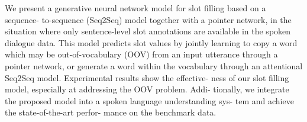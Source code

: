 We present a generative neural network model for slot filling based on a sequence- to-sequence (Seq2Seq) model together with a pointer network, in the situation where only sentence-level slot annotations are available in the spoken dialogue data. This model predicts slot values by jointly learning to copy a word which may be out-of-vocabulary (OOV) from an input utterance through a pointer network, or generate a word within the vocabulary through an attentional Seq2Seq model. Experimental results show the effective- ness of our slot filling model, especially at addressing the OOV problem. Addi- tionally, we integrate the proposed model into a spoken language understanding sys- tem and achieve the state-of-the-art perfor- mance on the benchmark data.
